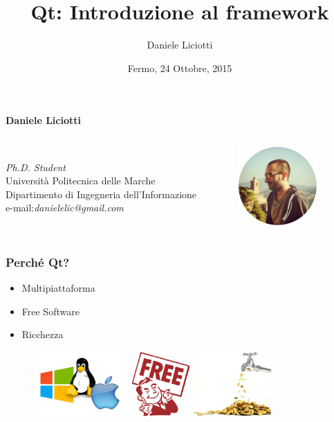 \documentclass{beamer}
\title{Qt: Introduzione al framework}
\subtitle{}
\author{Daniele Liciotti}
\institute{ICT Engineer and PhD Student}
\date{Fermo, 24 Ottobre, 2015}
\begin{document}
\maketitle
\begin{frame}
	\begin{block}{\textbf{Daniele Liciotti}}
		\begin{columns}
			\vspace{1cm}\\
			\emph{Ph.D. Student}\\
			Università Politecnica delle Marche\\
			Dipartimento di Ingegneria dell'Informazione\\
			
			\vspace{1cm}
			e-mail:\qquad \emph{danielelic@gmail.com}
			\begin{figure}
				\centering
				\includegraphics[height=3cm]{images/me.png}
			\end{figure}
	\end{columns}
	\end{block}
\end{frame}
\begin{frame}
	\frametitle{Perché Qt?}
	\begin{itemize}
		\item Multipiattaforma
		\item Free Software
		\item Ricchezza
	\end{itemize}
	\begin{figure}
		\includegraphics[height=2.5cm]{images/multiplat.png}
		\qquad
		\includegraphics[height=2.5cm]{images/free.png}
		\qquad
		\includegraphics[height=2.5cm]{images/money.jpg}
	\end{figure}
\end{frame}
\end{document}
